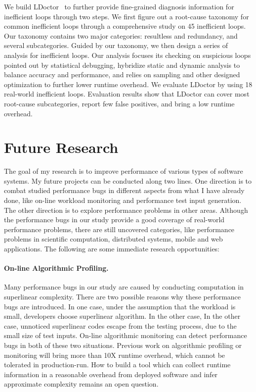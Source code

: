 \documentclass[10pt]{article}
\begin{document}
We build LDoctor~\cite{Song16PLDI} to further provide fine-grained diagnosis information for inefficient loops through two steps. 
We first figure out a root-cause taxonomy for common inefficient loops through a comprehensive study on 45 inefficient loops. 
Our taxonomy contains two major categories: resultless and redundancy, and several subcategories. 
Guided by our taxonomy, we then design a series of analysis for inefficient loops. 
Our analysis 
focuses its checking on suspicious loops pointed out by statistical debugging, 
hybridize static and dynamic analysis to balance accuracy and performance, 
and relies on sampling and other designed optimization to further lower runtime overhead. 
We evaluate LDoctor by using 18 real-world inefficient loops. 
Evaluation results show that LDoctor can cover most root-cause subcategories, 
report few false positives, and bring a low runtime overhead. 


\section{Future Research}

The goal of my research is to improve performance of various types of software systems. 
My future projects can be conducted along two lines. 
One direction is to combat studied performance bugs in different aspects from what I have already done, 
like on-line workload monitoring and performance test input generation. 
The other direction is to explore performance problems in other areas. 
Although the performance bugs in our study provide a good coverage of real-world performance problems, 
there are still uncovered categories, 
like performance problems in scientific computation, distributed systems, mobile and web applications. 
The following are some immediate research opportunities: 

\paragraph{On-line Algorithmic Profiling.}
Many performance bugs in our study are caused by conducting computation in superlinear complexity. 
There are two possible reasons why these performance bugs are introduced. 
In one case, under the assumption that the workload is small, developers choose superlinear algorithm. In the other case, 
In the other case, unnoticed superlinear codes escape from the testing process, due to the small size of test inputs. 
On-line algorithmic monitoring can detect performance bugs in both of these two situations. 
Previous work on algorithmic profiling or monitoring will bring more than 10X runtime overhead, 
which cannot be tolerated in production-run. 
How to build a tool which can collect runtime information in a reasonable overhead from deployed software 
and infer approximate complexity remains an open question. 
\end{document}

